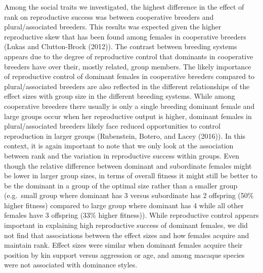 \documentclass[
]{article}
\begin{document}
Among the social traits we investigated, the highest difference in the
effect of rank on reproductive success was between cooperative breeders
and plural/associated breeders. This results was expected given the
higher reproductive skew that has been found among females in
cooperative breeders (Lukas and Clutton-Brock (2012)). The contrast
between breeding systems appears due to the degree of reproductive
control that dominants in cooperative breeders have over their, mostly
related, group members. The likely importance of reproductive control of
dominant females in cooperative breeders compared to plural/associated
breeders are also reflected in the different relationships of the effect
sizes with group size in the different breeding systems. While among
cooperative breeders there usually is only a single breeding dominant
female and large groups occur when her reproductive output is higher,
dominant females in plural/associated breeders likely face reduced
opportunities to control reproduction in larger groups (Rubenstein,
Botero, and Lacey (2016)). In this context, it is again important to
note that we only look at the association between rank and the variation
in reproductive success within groups. Even though the relative
difference between dominant and subordinate females might be lower in
larger group sizes, in terms of overall fitness it might still be better
to be the dominant in a group of the optimal size rather than a smaller
group (e.g.~small group where dominant has 3 versus subordinate has 2
offspring (50\% higher fitness) compared to large group where dominant
has 4 while all other females have 3 offspring (33\% higher fitness)).
While reproductive control appears important in explaining high
reproductive success of dominant females, we did not find that
associations between the effect sizes and how females acquire and
maintain rank. Effect sizes were similar when dominant females acquire
their position by kin support versus aggression or age, and among
macaque species were not associated with dominance styles.
\end{document}
